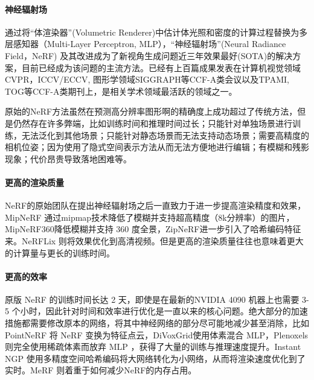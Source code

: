 \paragraph{神经辐射场} 

通过将“体渲染器”(Volumetric Renderer)中估计体光照和密度的计算过程替换为多层感知器（Multi-Layer Perceptron, MLP），“神经辐射场”(Neural Radiance Field，NeRF)\cite{mildenhallNeRFRepresentingScenes2020} 及其改进成为了新视角生成问题近三年效果最好(SOTA)的解决方案，目前已经成为该问题的主流方法。已经有上百篇成果发表在计算机视觉领域CVPR，ICCV/ECCV, 图形学领域SIGGRAPH等CCF-A类会议以及TPAMI, TOG等CCF-A类期刊上，是相关学术领域最活跃的领域之一。

原始的NeRF方法虽然在预测高分辨率图形啊的精确度上成功超过了传统方法，但是仍然存在许多弊端，比如训练时间和推理时间过长；只能针对单独场景进行训练，无法泛化到其他场景；只能针对静态场景而无法支持动态场景；需要高精度的相机位姿；因为使用了隐式空间表示方法从而无法方便地进行编辑；有模糊和残影现象；代价昂贵导致落地困难等。

\paragraph{更高的渲染质量}

NeRF的原始团队在提出神经辐射场之后一直致力于进一步提高渲染精度和效果，MipNeRF\cite{barronMipNeRFMultiscaleRepresentation2021} 通过mipmap技术降低了模糊并支持超高精度（8k分辨率）的图片，MipNeRF360\cite{barronMipNeRF360Unbounded2022}降低模糊并支持 360 度全景，ZipNeRF\cite{barronZipNeRFAntiAliasedGridBased2023}进一步引入了哈希编码特征来。NeRFLix\cite{zhouNeRFLiXHighQualityNeural2023} 则将效果优化到高清视频。但是更高的渲染质量往往也意味着更大的计算量与更长的训练时间。

\paragraph{更高的效率}

原版 NeRF 的训练时间长达 2 天，即使是在最新的NVIDIA 4090 机器上也需要 3-5 个小时，因此针对时间和效率进行优化是一直以来的核心问题。绝大部分的加速措施都需要修改原本的网络，将其中神经网络的部分尽可能地减少甚至消除，比如PointNeRF\cite{xuPointNeRFPointbasedNeurala} 将 NeRF 变换为特征点云，DiVoxGrid\cite{sunDirectVoxelGrid2022}使用体素混合 MLP，Plenoxels\cite{yuPlenoxelsRadianceFields2021} 则完全使用稀疏体素而放弃 MLP ，获得了大量的训练与推理速度提升。Instant NGP \cite{mullerInstantNeuralGraphics2022} 使用多精度空间哈希编码将大网络转化为小网络，从而将渲染速度优化到了实时。MeRF\cite{reiserMERFMemoryEfficientRadiance2023} 则着重于如何减少NeRF的内存占用。

